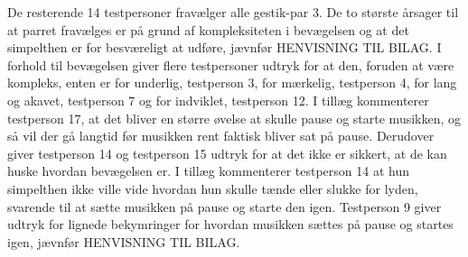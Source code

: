 De resterende 14 testpersoner fravælger alle gestik-par 3. De to største årsager til at parret fravælges er på grund af kompleksiteten i bevægelsen og at det simpelthen er for besværeligt at udføre, jævnfør HENVISNING TIL BILAG. I forhold til bevægelsen giver flere testpersoner udtryk for at den, foruden at være kompleks, enten er for underlig, testperson 3, for mærkelig, testperson 4, for lang og akavet, testperson 7 og for indviklet, testperson 12. I tillæg kommenterer testperson 17, at det bliver en større øvelse at skulle pause og starte musikken, og så vil der gå langtid før musikken rent faktisk bliver sat på pause. Derudover giver testperson 14 og testperson 15 udtryk for at det ikke er sikkert, at de kan huske hvordan bevægelsen er. I tillæg kommenterer testperson 14 at hun simpelthen ikke ville vide hvordan hun skulle tænde eller slukke for lyden, svarende til at sætte musikken på pause og starte den igen. Testperson 9 giver udtryk for lignede bekymringer for hvordan musikken sættes på pause og startes igen, jævnfør HENVISNING TIL BILAG.

